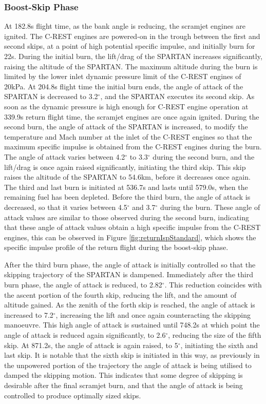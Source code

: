 \subsubsection{ Boost-Skip Phase}\label{sec:boost}
At 182.8s flight time, as the bank angle is reducing, the scramjet engines are ignited. The C-REST engines are powered-on in the trough between the first and second skips, at a point of high potential specific impulse, and initially burn for 22s. During the initial burn, the lift/drag of the SPARTAN increases significantly, raising the altitude of the SPARTAN. The maximum altitude during the burn is limited by the lower inlet dynamic pressure limit of the C-REST engines of 20kPa. 
At 204.8s flight time the initial burn ends, the angle of attack of the SPARTAN is decreased to 3.2$^\circ$, and the SPARTAN executes its second skip. As soon as the dynamic pressure is high enough for C-REST engine operation at 339.9s return flight time, the scramjet engines are once again ignited.
During the second burn, the angle of attack of the SPARTAN is increased, to modify the temperature and Mach number at the inlet of the C-REST engines so that the maximum specific impulse is obtained from the C-REST engines during the burn. 
The angle of attack varies between 4.2$^\circ$ to 3.3$^\circ$ during the second burn, and the lift/drag is once again raised significantly, initiating the third skip. 
This skip raises the altitude of the SPARTAN to 54.6km, before it decreases once again. 
The third and last burn is initiated at 536.7s and lasts until 579.0s, when the remaining fuel has been depleted. Before the third burn, the angle of attack is decreased, so that it varies between 4.5$^\circ$ and 3.7$^\circ$ during the burn. These angle of attack values are similar to those observed during the second burn, indicating that these angle of attack values obtain a high specific impulse from the C-REST engines, this can be observed in Figure \ref{fig:returnIspStandard}, which shows the specific impulse profile of the return flight during the boost-skip phase. 

After the third burn phase, the angle of attack is initially controlled so that the skipping trajectory of the SPARTAN is dampened.
Immediately after the third burn phase, the angle of attack is reduced, to 2.82$^\circ$. This reduction coincides with the ascent portion of the fourth skip, reducing the lift, and the amount of altitude gained. 
As the zenith of the forth skip is reached, the angle of attack is increased to 7.2$^\circ$, increasing the lift and once again counteracting the skipping manoeuvre. 
This high angle of attack is sustained until 748.2s at which point the angle of attack is reduced again significantly, to 2.6$^\circ$, reducing the size of the fifth skip. At 871.2s, the angle of attack is again raised, to 5$^\circ$, initiating the sixth and last skip.
It is notable that the sixth skip is initiated in this way, as previously in the unpowered portion of the trajectory the angle of attack is being utilised to damped the skipping motion. This indicates that some degree of skipping is desirable after the final scramjet burn, and that the angle of attack is being controlled to produce optimally sized skips. 

